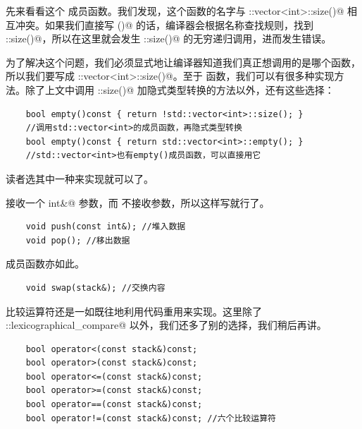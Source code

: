 先来看看这个 \lstinline@size@ 成员函数。我们发现，这个函数的名字与 \lstinline@std::vector<int>::size()@ 相互冲突。如果我们直接写 \lstinline@size()@ 的话，编译器会根据名称查找规则，找到 \lstinline@stack::size()@，所以在这里就会发生 \lstinline@stack::size()@ 的无穷递归调用，进而发生错误。\par
为了解决这个问题，我们必须显式地让编译器知道我们真正想调用的是哪个函数，所以我们要写成 \lstinline@std::vector<int>::size()@。至于 \lstinline@empty@ 函数，我们可以有很多种实现方法。除了上文中调用 \lstinline@stack::size()@ 加隐式类型转换的方法以外，还有这些选择：
\begin{lstlisting}
    bool empty()const { return !std::vector<int>::size(); }
    //调用std::vector<int>的成员函数，再隐式类型转换
    bool empty()const { return std::vector<int>::empty(); }
    //std::vector<int>也有empty()成员函数，可以直接用它
\end{lstlisting}
读者选其中一种来实现就可以了。\par
\lstinline@push@ 接收一个 \lstinline@const int&@ 参数，而 \lstinline@pop@ 不接收参数，所以这样写就行了。
\begin{lstlisting}
    void push(const int&); //堆入数据
    void pop(); //移出数据
\end{lstlisting}\par\pagebreak
\lstinline@swap@ 成员函数亦如此。
\begin{lstlisting}
    void swap(stack&); //交换内容
\end{lstlisting}\par
比较运算符还是一如既往地利用代码重用来实现。这里除了 \lstinline@std::lexicographical_compare@ 以外，我们还多了别的选择，我们稍后再讲。
\begin{lstlisting}
    bool operator<(const stack&)const;
    bool operator>(const stack&)const;
    bool operator<=(const stack&)const;
    bool operator>=(const stack&)const;
    bool operator==(const stack&)const;
    bool operator!=(const stack&)const; //六个比较运算符
\end{lstlisting}\par
